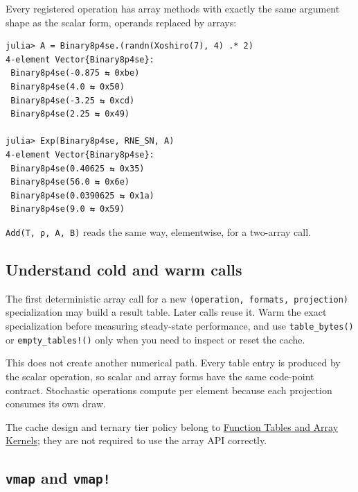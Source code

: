 \label{5567456132284147075}{}


Every registered operation has array methods with exactly the same argument shape as the scalar form, operands replaced by arrays:




\nopagebreak[4]
\begin{verbatim}
julia> A = Binary8p4se.(randn(Xoshiro(7), 4) .* 2)
4-element Vector{Binary8p4se}:
 Binary8p4se(-0.875 ⇆ 0xbe)
 Binary8p4se(4.0 ⇆ 0x50)
 Binary8p4se(-3.25 ⇆ 0xcd)
 Binary8p4se(2.25 ⇆ 0x49)

julia> Exp(Binary8p4se, RNE_SN, A)
4-element Vector{Binary8p4se}:
 Binary8p4se(0.40625 ⇆ 0x35)
 Binary8p4se(56.0 ⇆ 0x6e)
 Binary8p4se(0.0390625 ⇆ 0x1a)
 Binary8p4se(9.0 ⇆ 0x59)
\end{verbatim}



\texttt{Add(T, ρ, A, B)} reads the same way, elementwise, for a two-array call.



\subsection{Understand cold and warm calls}



\label{17639165607647763697}{}


The first deterministic array call for a new \texttt{(\allowbreak{}operation, formats, projection)} specialization may build a result table. Later calls reuse it. Warm the exact specialization before measuring steady-state performance, and use \texttt{table\_\allowbreak{}bytes()} or \texttt{empty\_\allowbreak{}tables!()} only when you need to inspect or reset the cache.



This does not create another numerical path. Every table entry is produced by the scalar operation, so scalar and array forms have the same code-point contract. Stochastic operations compute per element because each projection consumes its own draw.



The cache design and ternary tier policy belong to \href{internals\_\allowbreak{}tables.md}{Function Tables and Array Kernels}; they are not required to use the array API correctly.



\subsection{\texttt{vmap} and \texttt{vmap!}}



